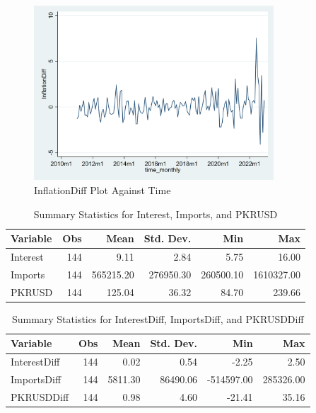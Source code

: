 \documentclass[11pt]{article}
\begin{document}
\begin{figure}[h]
\centering
\includegraphics[width=0.8\textwidth]{images/Figure5.png}
\caption{InflationDiff Plot Against Time}
\end{figure}

\begin{table}[ht]
\centering
\begin{tabular}{lrrrrr}
\hline
Variable & Obs & Mean & Std. Dev. & Min & Max \\
\hline
Interest & 144 & 9.11 & 2.84 & 5.75 & 16.00 \\
Imports & 144 & 565215.20 & 276950.30 & 260500.10 & 1610327.00 \\
PKRUSD & 144 & 125.04 & 36.32 & 84.70 & 239.66 \\
\hline
\end{tabular}
\caption{Summary Statistics for Interest, Imports, and PKRUSD}
\label{table:interest_imports_pkrusd_summary_statistics}
\end{table}

\begin{table}[ht]
\centering
\begin{tabular}{lrrrrr}
\hline
Variable & Obs & Mean & Std. Dev. & Min & Max \\
\hline
InterestDiff & 144 & 0.02 & 0.54 & -2.25 & 2.50 \\
ImportsDiff & 144 & 5811.30 & 86490.06 & -514597.00 & 285326.00 \\
PKRUSDDiff & 144 & 0.98 & 4.60 & -21.41 & 35.16 \\
\hline
\end{tabular}
\caption{Summary Statistics for InterestDiff, ImportsDiff, and PKRUSDDiff}
\label{table:interestdiff_importsdiff_pkrusddiff_summary_statistics}
\end{table}
\end{document}
